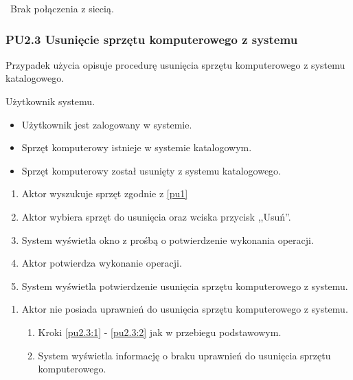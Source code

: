 \
Brak połączenia z siecią.

\subsubsection{PU2.3 Usunięcie sprzętu komputerowego z systemu}

Przypadek użycia opisuje procedurę usunięcia sprzętu komputerowego z systemu katalogowego.

Użytkownik systemu.

\begin{itemize}
\item Użytkownik jest zalogowany w systemie.
\item Sprzęt komputerowy istnieje w systemie katalogowym.
\end{itemize}

\begin{itemize}
\item Sprzęt komputerowy został usunięty z systemu katalogowego.
\end{itemize}

\begin{enumerate}
\item \label{pu2.3:1} Aktor wyszukuje sprzęt zgodnie z \ref{pu1}
\item \label{pu2.3:2} Aktor wybiera sprzęt do usunięcia oraz wciska przycisk ,,Usuń''.
\item System wyświetla okno z prośbą o potwierdzenie wykonania operacji.
\item Aktor potwierdza wykonanie operacji.
\item System wyświetla potwierdzenie usunięcia sprzętu komputerowego z systemu.
\end{enumerate}

\begin{enumerate}
\item Aktor nie posiada uprawnień do usunięcia sprzętu komputerowego z systemu.
	\begin{enumerate}[label*=\arabic*.]
		\item Kroki \ref{pu2.3:1} - \ref{pu2.3:2} jak w przebiegu podstawowym.
		\item System wyświetla informację o braku uprawnień do usunięcia sprzętu komputerowego.
	\end{enumerate}
\end{enumerate}

